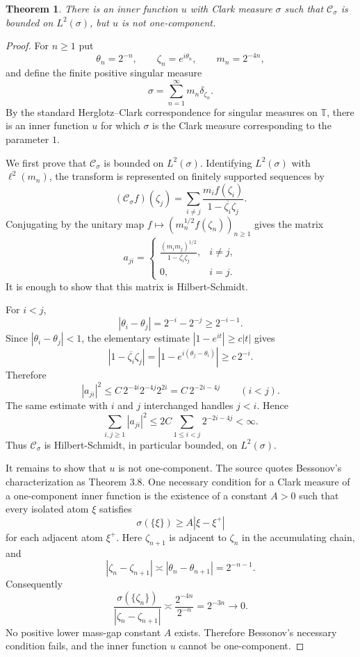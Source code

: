 \documentclass[11pt]{article}
\newtheorem{theorem}{Theorem}
\newcommand{\T}{\mathbb T}
\newcommand{\cC}{\mathcal C}
\begin{document}
\begin{theorem}
There is an inner function $u$ with Clark measure $\sigma$ such that
$\cC_\sigma$ is bounded on $L^2(\sigma)$, but $u$ is not one-component.
\end{theorem}

\begin{proof}
For $n\ge1$ put
\[
  \theta_n=2^{-n},\qquad
  \zeta_n=e^{i\theta_n},\qquad
  m_n=2^{-4n},
\]
and define the finite positive singular measure
\[
  \sigma=\sum_{n=1}^{\infty} m_n\delta_{\zeta_n}.
\]
By the standard Herglotz--Clark correspondence for singular measures on
$\T$, there is an inner function $u$ for which $\sigma$ is the Clark measure
corresponding to the parameter $1$.

We first prove that $\cC_\sigma$ is bounded on $L^2(\sigma)$. Identifying
$L^2(\sigma)$ with $\ell^2(m_n)$, the transform is represented on finitely
supported sequences by
\[
  (\cC_\sigma f)(\zeta_j)
  =
  \sum_{i\ne j}
    \frac{m_i f(\zeta_i)}
         {1-\overline{\zeta_i}\zeta_j}.
\]
Conjugating by the unitary map
$f\mapsto (m_n^{1/2}f(\zeta_n))_{n\ge1}$ gives the matrix
\[
  a_{ji}
  =
  \begin{cases}
  \displaystyle
  \frac{(m_i m_j)^{1/2}}
       {1-\overline{\zeta_i}\zeta_j},& i\ne j,\\[1.2ex]
  0,&i=j.
  \end{cases}
\]
It is enough to show that this matrix is Hilbert-Schmidt.

For $i<j$,
\[
  |\theta_i-\theta_j|
  =
  2^{-i}-2^{-j}
  \ge 2^{-i-1}.
\]
Since $|\theta_i-\theta_j|<1$, the elementary estimate
$|1-e^{it}|\ge c|t|$ gives
\[
  |1-\overline{\zeta_i}\zeta_j|
  =
  |1-e^{i(\theta_j-\theta_i)}|
  \ge c\,2^{-i}.
\]
Therefore
\[
  |a_{ji}|^2
  \le
  C\,2^{-4i}2^{-4j}2^{2i}
  =
  C\,2^{-2i-4j}
  \qquad (i<j).
\]
The same estimate with $i$ and $j$ interchanged handles $j<i$. Hence
\[
  \sum_{i,j\ge1}|a_{ji}|^2
  \le
  2C\sum_{1\le i<j}2^{-2i-4j}
  <\infty.
\]
Thus $\cC_\sigma$ is Hilbert-Schmidt, in particular bounded, on
$L^2(\sigma)$.

It remains to show that $u$ is not one-component. The source quotes
Bessonov's characterization as Theorem 3.8. One necessary condition for a
Clark measure of a one-component inner function is the existence of a
constant $A>0$ such that every isolated atom $\xi$ satisfies
\[
  \sigma(\{\xi\})\ge A|\xi-\xi^+|
\]
for each adjacent atom $\xi^+$.
Here $\zeta_{n+1}$ is adjacent to $\zeta_n$ in the accumulating chain, and
\[
  |\zeta_n-\zeta_{n+1}|
  \asymp
  |\theta_n-\theta_{n+1}|
  =
  2^{-n-1}.
\]
Consequently
\[
  \frac{\sigma(\{\zeta_n\})}{|\zeta_n-\zeta_{n+1}|}
  \asymp
  \frac{2^{-4n}}{2^{-n}}
  =
  2^{-3n}
  \longrightarrow 0.
\]
No positive lower mass-gap constant $A$ exists. Therefore Bessonov's
necessary condition fails, and the inner function $u$ cannot be
one-component.
\end{proof}
\end{document}

